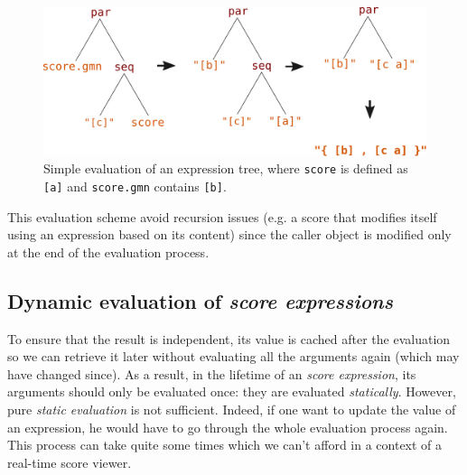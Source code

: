 \documentclass{article}
\newcommand{\OSC}[1]{\texttt{#1}}
\newcommand{\sExpr}{\emph{score expressions}}
\begin{document}
\begin{figure}[th]
\centering
\includegraphics[width=1\columnwidth]{imgs/classicEval}
\caption{Simple evaluation of an expression tree,
where \OSC{score} is defined as \OSC{[a]}
and \OSC{score.gmn} contains \OSC{[b]}.
\label{fig:classicEval} }
\end{figure}

This evaluation scheme avoid recursion issues (e.g. a score that modifies itself using an expression based on its content) since the caller object is modified only at the end of the evaluation process. 

\subsection{Dynamic evaluation of \sExpr}

To ensure that the result is independent, its value is cached after the evaluation so we can retrieve it later without evaluating all the arguments again (which may have changed since). As a result, in the lifetime of an \emph{score expression}, its arguments should only be evaluated once: they are evaluated \emph{statically}.
However, pure \emph{static evaluation} is not sufficient. Indeed, if one want to update the value of an expression, he would have to go through the whole evaluation process again. This process can take quite some times which we can't afford in a context of a real-time score viewer.
\end{document}
